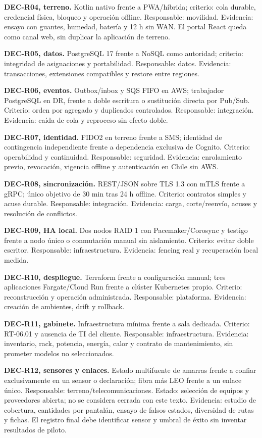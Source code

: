 \documentclass[11pt,letterpaper]{report}
\begin{document}
\textbf{DEC-R04, terreno.} Kotlin nativo frente a PWA/híbrida; criterio: cola durable, credencial física, bloqueo y operación offline. Responsable: movilidad. Evidencia: ensayo con guantes, humedad, batería y 12 h sin WAN. El portal React queda como canal web, sin duplicar la aplicación de terreno.

\textbf{DEC-R05, datos.} PostgreSQL 17 frente a NoSQL como autoridad; criterio: integridad de asignaciones y portabilidad. Responsable: datos. Evidencia: transacciones, extensiones compatibles y restore entre regiones.

\textbf{DEC-R06, eventos.} Outbox/inbox y SQS FIFO en AWS; trabajador PostgreSQL en DR, frente a doble escritura o sustitución directa por Pub/Sub. Criterio: orden por agregado y duplicados controlados. Responsable: integración. Evidencia: caída de cola y reproceso sin efecto doble.

\textbf{DEC-R07, identidad.} FIDO2 en terreno frente a SMS; identidad de contingencia independiente frente a dependencia exclusiva de Cognito. Criterio: operabilidad y continuidad. Responsable: seguridad. Evidencia: enrolamiento previo, revocación, vigencia offline y autenticación en Chile sin AWS.

\textbf{DEC-R08, sincronización.} REST/JSON sobre TLS 1.3 con mTLS frente a gRPC; único objetivo de 30 min tras 24 h offline. Criterio: contratos simples y acuse durable. Responsable: integración. Evidencia: carga, corte/reenvío, acuses y resolución de conflictos.

\textbf{DEC-R09, HA local.} Dos nodos RAID 1 con Pacemaker/Corosync y testigo frente a nodo único o conmutación manual sin aislamiento. Criterio: evitar doble escritor. Responsable: infraestructura. Evidencia: fencing real y recuperación local medida.

\textbf{DEC-R10, despliegue.} Terraform frente a configuración manual; tres aplicaciones Fargate/Cloud Run frente a clúster Kubernetes propio. Criterio: reconstrucción y operación administrada. Responsable: plataforma. Evidencia: creación de ambientes, drift y rollback.

\textbf{DEC-R11, gabinete.} Infraestructura mínima frente a sala dedicada. Criterio: RT-06.01 y ausencia de TI del cliente. Responsable: infraestructura. Evidencia: inventario, rack, potencia, energía, calor y contrato de mantenimiento, sin prometer modelos no seleccionados.

\textbf{DEC-R12, sensores y enlaces.} Estado multifuente de amarras frente a confiar exclusivamente en un sensor o declaración; fibra más LEO frente a un enlace único. Responsable: terreno/telecomunicaciones. Estado: selección de equipos y proveedores abierta; no se considera cerrada con este texto. Evidencia: estudio de cobertura, cantidades por pantalán, ensayo de falsos estados, diversidad de rutas y fichas. El registro final debe identificar sensor y umbral de éxito sin inventar resultados de piloto.
\end{document}
